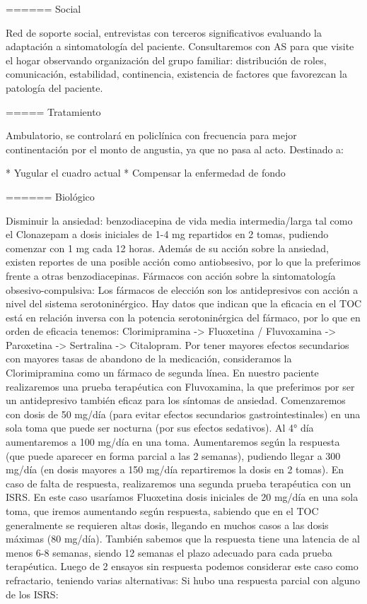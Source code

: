 \documentclass[encares.tex]{subfiles}
\begin{document}
====== Social

Red de soporte social, entrevistas con terceros significativos evaluando la adaptación a sintomatología del paciente. Consultaremos con AS para que visite el hogar observando organización del grupo familiar: distribución de roles, comunicación, estabilidad, continencia, existencia de factores que favorezcan la patología del paciente.

===== Tratamiento

Ambulatorio, se controlará en policlínica con frecuencia para mejor continentación por el monto de angustia, ya que no pasa al acto. Destinado a:

* Yugular el cuadro actual
* Compensar la enfermedad de fondo

====== Biológico

Disminuir la ansiedad: benzodiacepina de vida media intermedia/larga tal como el Clonazepam a dosis iniciales de 1-4 mg repartidos en 2 tomas, pudiendo comenzar con 1 mg cada 12 horas. Además de su acción sobre la ansiedad, existen reportes de una posible acción como antiobsesivo, por lo que la preferimos frente a otras benzodiacepinas. Fármacos con acción sobre la sintomatología obsesivo-compulsiva: Los fármacos de elección son los antidepresivos con acción a nivel del sistema serotoninérgico. Hay datos que indican que la eficacia en el TOC está en relación inversa con la potencia serotoninérgica del fármaco, por lo que en orden de eficacia tenemos: Clorimipramina -> Fluoxetina / Fluvoxamina -> Paroxetina -> Sertralina -> Citalopram. Por tener mayores efectos secundarios con mayores tasas de abandono de la medicación, consideramos la Clorimipramina como un fármaco de segunda línea. En nuestro paciente realizaremos una prueba terapéutica con Fluvoxamina, la que preferimos por ser un antidepresivo también eficaz para los síntomas de ansiedad. Comenzaremos con dosis de 50 mg/día (para evitar efectos secundarios gastrointestinales) en una sola toma que puede ser nocturna (por sus efectos sedativos). Al 4° día aumentaremos a 100 mg/día en una toma. Aumentaremos según la respuesta (que puede aparecer en forma parcial a las 2 semanas), pudiendo llegar a 300 mg/día (en dosis mayores a 150 mg/día repartiremos la dosis en 2 tomas). En caso de falta de respuesta, realizaremos una segunda prueba terapéutica con un ISRS. En este caso usaríamos Fluoxetina dosis iniciales de 20 mg/día en una sola toma, que iremos aumentando según respuesta, sabiendo que en el TOC generalmente se requieren altas dosis, llegando en muchos casos a las dosis máximas (80 mg/día). También sabemos que la respuesta tiene una latencia de al menos 6-8 semanas, siendo 12 semanas el plazo adecuado para cada prueba terapéutica. Luego de 2 ensayos sin respuesta podemos considerar este caso como refractario, teniendo varias alternativas: Si hubo una respuesta parcial con alguno de los ISRS:
\end{document}
